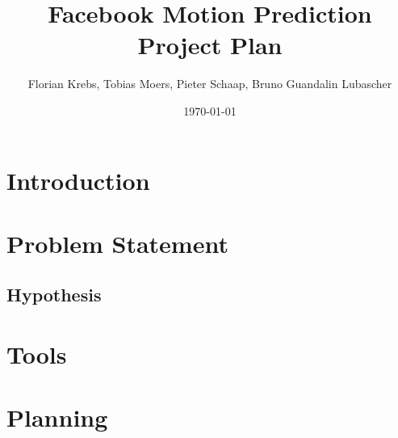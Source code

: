 \documentclass[10pt,a4paper]{article}
\title{{\Huge Facebook Motion Prediction}\\{\Large Project Plan}}
\author{Florian Krebs, Tobias Moers, Pieter Schaap, Bruno Guandalin Lubascher}
\date{\today}
\begin{document}
	
	\maketitle
	
\begin{abstract}
\end{abstract}

\newpage
\tableofcontents
\newpage


\section{Introduction}


\section{Problem Statement}

\subsection{Hypothesis}

\section{Tools}



\section{Planning}

 
\end{document}
